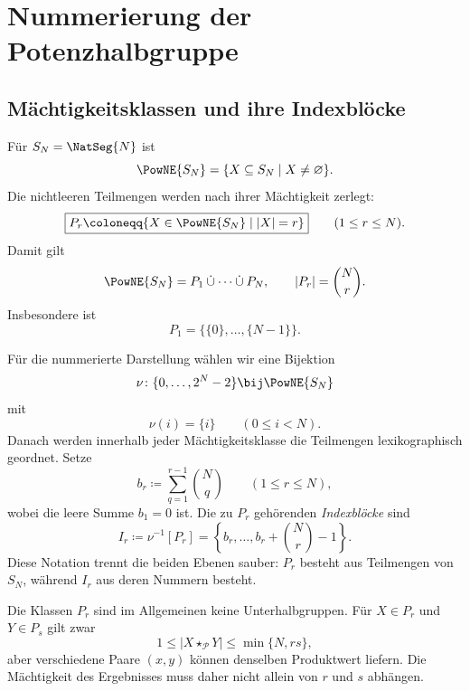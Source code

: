 \documentclass[main.tex]{subfiles}
\begin{document}
\section{Nummerierung der Potenzhalbgruppe}

\subsection{Mächtigkeitsklassen und ihre Indexblöcke}

Für \(S_N=\NatSeg{N}\) ist
\[
  \PowNE{S_N}
  =
  \{X\subseteq S_N\mid X\neq\varnothing\}.
\]
Die nichtleeren Teilmengen werden nach ihrer Mächtigkeit zerlegt:
\[
  \boxed{
  P_r
  \coloneqq
  \{X\in\PowNE{S_N}\mid |X|=r\}}
  \qquad(1\leq r\leq N).
\]
Damit gilt
\[
  \PowNE{S_N}
  =
  P_1\mathbin{\dot\cup}\cdots\mathbin{\dot\cup}P_N,
  \qquad
  |P_r|=\binom{N}{r}.
\]
Insbesondere ist
\[
  P_1=\bigl\{\{0\},\ldots,\{N-1\}\bigr\}.
\]

Für die nummerierte Darstellung wählen wir eine Bijektion
\[
  \nu\colon
  \{0,\ldots,2^N-2\}
  \bij
  \PowNE{S_N}
\]
mit
\[
  \nu(i)=\{i\}
  \qquad(0\leq i<N).
\]
Danach werden innerhalb jeder Mächtigkeitsklasse die Teilmengen
lexikographisch geordnet.  Setze
\[
  b_r\coloneqq
  \sum_{q=1}^{r-1}\binom{N}{q}
  \qquad(1\leq r\leq N),
\]
wobei die leere Summe \(b_1=0\) ist.  Die zu \(P_r\) gehörenden
\emph{Indexblöcke} sind
\[
  \boxed{
  I_r
  \coloneqq
  \nu^{-1}[P_r]
  =
  \left\{
    b_r,\ldots,b_r+\binom{N}{r}-1
  \right\}.}
\]
Diese Notation trennt die beiden Ebenen sauber: \(P_r\) besteht aus
Teilmengen von \(S_N\), während \(I_r\) aus deren Nummern besteht.

Die Klassen \(P_r\) sind im Allgemeinen keine Unterhalbgruppen.  Für
\(X\in P_r\) und \(Y\in P_s\) gilt zwar
\[
  1\leq|X\star_{\mathcal P}Y|
  \leq\min\{N,rs\},
\]
aber verschiedene Paare \((x,y)\) können denselben Produktwert liefern.  Die
Mächtigkeit des Ergebnisses muss daher nicht allein von \(r\) und \(s\)
abhängen.
\end{document}
